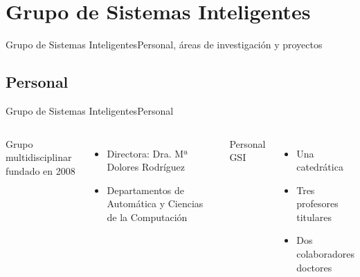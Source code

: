 \documentclass[10pt,compress]{beamer} %
\begin{document}
\section{Grupo de Sistemas Inteligentes}
{
    \sectionheaderWhite %
    \begin{frame}{Grupo de Sistemas Inteligentes}{Personal, áreas de investigación y proyectos}
    \end{frame}
}

\subsection{Personal}
\begin{frame}{Grupo de Sistemas Inteligentes}{Personal}
    \begin{columns}
    Grupo multidisciplinar fundado en 2008
        \begin{itemize}
        \item Directora: Dra. Mª Dolores Rodríguez
        \item Departamentos de Automática y Ciencias de la Computación
        \end{itemize}

	Personal GSI
		\begin{itemize}
		\item Una catedrática
		\item Tres profesores titulares
		\item Dos colaboradores doctores
		\end{itemize}


\end{columns}
\end{frame}
\end{document}
